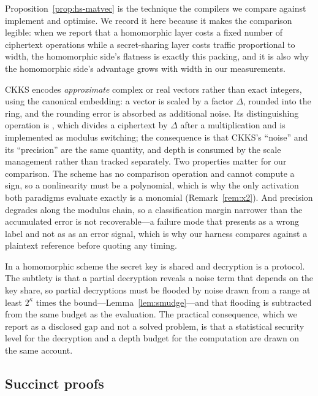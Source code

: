 Proposition~\ref{prop:hs-matvec} is the technique the compilers we compare against
implement and optimise. We record it here because it makes the comparison legible:
when we report that a homomorphic layer costs a fixed number of ciphertext
operations while a secret-sharing layer costs traffic proportional to width, the
homomorphic side's flatness is exactly this packing, and it is also why the
homomorphic side's advantage grows with width in our measurements.

\begin{remark}
\label{rem:ckks}
CKKS encodes \emph{approximate} complex or real vectors rather than exact
integers, using the canonical embedding: a vector is scaled by a factor $\Delta$,
rounded into the ring, and the rounding error is absorbed as additional noise.
Its distinguishing operation is , which divides a ciphertext by
$\Delta$ after a multiplication and is implemented as modulus switching; the
consequence is that CKKS's ``noise'' and its ``precision'' are the same quantity,
and depth is consumed by the scale management rather than tracked separately. Two
properties matter for our comparison. The scheme has no comparison operation and
cannot compute a sign, so a nonlinearity must be a polynomial, which is why the
only activation both paradigms evaluate exactly is a monomial
(Remark~\ref{rem:x2}). And precision degrades along the modulus chain, so a
classification margin narrower than the accumulated error is not recoverable---a
failure mode that presents as a wrong label and not as as an error signal, which
is why our harness compares against a plaintext reference before quoting any
timing.
\end{remark}

\begin{remark}
\label{rem:threshold}
In a  homomorphic scheme the secret key is shared and decryption is
a protocol. The subtlety is that a partial decryption reveals a noise term that
depends on the key share, so partial decryptions must be flooded by noise drawn
from a range at least $2^{\kappa}$ times the bound---Lemma~\ref{lem:smudge}---and
that flooding is subtracted from the same budget as the evaluation. The practical
consequence, which we report as a disclosed gap and not a solved problem, is
that a statistical security level for the decryption and a depth budget for the
computation are drawn on the same account.
\end{remark}

\subsection{Succinct proofs}
\label{sec:found:zk}

